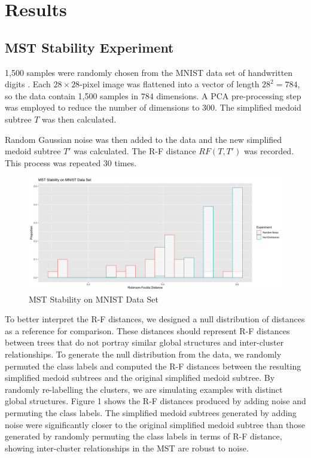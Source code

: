\documentclass{article}
\begin{document}
{\section{Results}

\subsection{MST Stability Experiment}
1,500 samples were randomly chosen from the MNIST data set of handwritten digits \cite{MNIST}. Each $28 \times 28$-pixel image was flattened into a vector of length $28^2 = 784$, so the data contain 1,500 samples in $784$ dimensions. A PCA pre-processing step was employed to reduce the number of dimensions to 300. The simplified medoid subtree $T$ was then calculated.

Random Gaussian noise was then added to the data and the new simplified medoid subtree $T'$ was calculated. The R-F distance $RF(T, T')$ was recorded. This process was repeated 30 times.

\renewcommand{\figurename}{Figure}
\renewcommand{\thefigure}{1}
\begin{figure}[!b]
\centering
\includegraphics[scale=0.3]{RF stability}
\caption{MST Stability on MNIST Data Set}
\end{figure}

To better interpret the R-F distances, we designed a null distribution of distances as a reference for comparison. These distances should represent R-F distances between trees that do not portray similar global structures and inter-cluster relationships. To generate the null distribution from the data, we randomly permuted the class labels and computed the R-F distances between the resulting simplified medoid subtrees and the original simplified medoid subtree. By randomly re-labelling the clusters, we are simulating examples with distinct global structures. Figure 1 shows the R-F distances produced by adding noise and permuting the class labels. The simplified medoid subtrees generated by adding noise were significantly closer to the original simplified medoid subtree than those generated by randomly permuting the class labels in terms of R-F distance, showing inter-cluster relationships in the MST are robust to noise.

}
\end{document}
